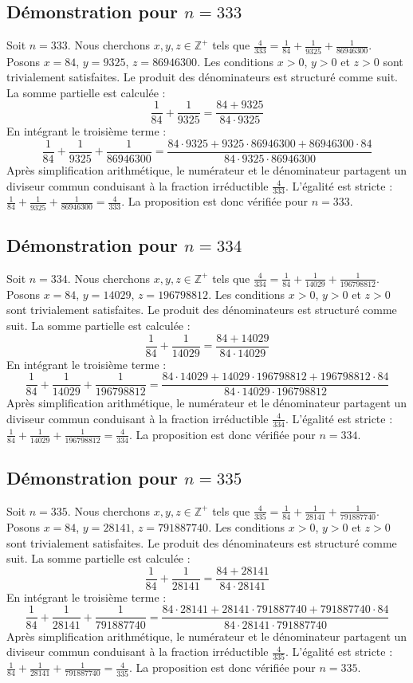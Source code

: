 \documentclass[11pt,a4paper]{article}
\begin{document}
\subsection{Démonstration pour $n = 333$}
Soit $n = 333$. Nous cherchons $x, y, z \in \mathbb{Z}^{+}$ tels que $\frac{4}{333} = \frac{1}{84} + \frac{1}{9325} + \frac{1}{86946300}$.
Posons $x = 84$, $y = 9325$, $z = 86946300$.
Les conditions $x > 0$, $y > 0$ et $z > 0$ sont trivialement satisfaites.
Le produit des dénominateurs est structuré comme suit. La somme partielle est calculée :
$$ \frac{1}{84} + \frac{1}{9325} = \frac{84+9325}{84 \cdot 9325} $$
En intégrant le troisième terme :
$$ \frac{1}{84} + \frac{1}{9325} + \frac{1}{86946300} = \frac{84 \cdot 9325 + 9325 \cdot 86946300 + 86946300 \cdot 84}{84 \cdot 9325 \cdot 86946300} $$
Après simplification arithmétique, le numérateur et le dénominateur partagent un diviseur commun conduisant à la fraction irréductible $\frac{4}{333}$.
L'égalité est stricte : $\frac{1}{84} + \frac{1}{9325} + \frac{1}{86946300} = \frac{4}{333}$.
La proposition est donc vérifiée pour $n = 333$.
\subsection{Démonstration pour $n = 334$}
Soit $n = 334$. Nous cherchons $x, y, z \in \mathbb{Z}^{+}$ tels que $\frac{4}{334} = \frac{1}{84} + \frac{1}{14029} + \frac{1}{196798812}$.
Posons $x = 84$, $y = 14029$, $z = 196798812$.
Les conditions $x > 0$, $y > 0$ et $z > 0$ sont trivialement satisfaites.
Le produit des dénominateurs est structuré comme suit. La somme partielle est calculée :
$$ \frac{1}{84} + \frac{1}{14029} = \frac{84+14029}{84 \cdot 14029} $$
En intégrant le troisième terme :
$$ \frac{1}{84} + \frac{1}{14029} + \frac{1}{196798812} = \frac{84 \cdot 14029 + 14029 \cdot 196798812 + 196798812 \cdot 84}{84 \cdot 14029 \cdot 196798812} $$
Après simplification arithmétique, le numérateur et le dénominateur partagent un diviseur commun conduisant à la fraction irréductible $\frac{4}{334}$.
L'égalité est stricte : $\frac{1}{84} + \frac{1}{14029} + \frac{1}{196798812} = \frac{4}{334}$.
La proposition est donc vérifiée pour $n = 334$.
\subsection{Démonstration pour $n = 335$}
Soit $n = 335$. Nous cherchons $x, y, z \in \mathbb{Z}^{+}$ tels que $\frac{4}{335} = \frac{1}{84} + \frac{1}{28141} + \frac{1}{791887740}$.
Posons $x = 84$, $y = 28141$, $z = 791887740$.
Les conditions $x > 0$, $y > 0$ et $z > 0$ sont trivialement satisfaites.
Le produit des dénominateurs est structuré comme suit. La somme partielle est calculée :
$$ \frac{1}{84} + \frac{1}{28141} = \frac{84+28141}{84 \cdot 28141} $$
En intégrant le troisième terme :
$$ \frac{1}{84} + \frac{1}{28141} + \frac{1}{791887740} = \frac{84 \cdot 28141 + 28141 \cdot 791887740 + 791887740 \cdot 84}{84 \cdot 28141 \cdot 791887740} $$
Après simplification arithmétique, le numérateur et le dénominateur partagent un diviseur commun conduisant à la fraction irréductible $\frac{4}{335}$.
L'égalité est stricte : $\frac{1}{84} + \frac{1}{28141} + \frac{1}{791887740} = \frac{4}{335}$.
La proposition est donc vérifiée pour $n = 335$.
\end{document}
